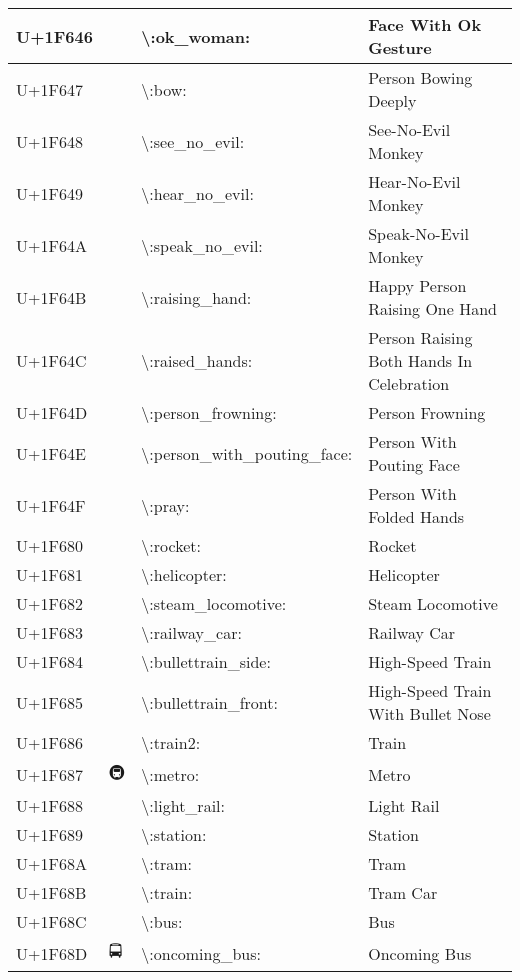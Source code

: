 \begin{table}[h]
\begin{tabulary}{\linewidth}{|L|L|L|L|}
\hline
U+1F646 & 🙆 & {\textbackslash}:ok\_woman: & Face With Ok Gesture \\
\hline
U+1F647 & 🙇 & {\textbackslash}:bow: & Person Bowing Deeply \\
\hline
U+1F648 & 🙈 & {\textbackslash}:see\_no\_evil: & See-No-Evil Monkey \\
\hline
U+1F649 & 🙉 & {\textbackslash}:hear\_no\_evil: & Hear-No-Evil Monkey \\
\hline
U+1F64A & 🙊 & {\textbackslash}:speak\_no\_evil: & Speak-No-Evil Monkey \\
\hline
U+1F64B & 🙋 & {\textbackslash}:raising\_hand: & Happy Person Raising One Hand \\
\hline
U+1F64C & 🙌 & {\textbackslash}:raised\_hands: & Person Raising Both Hands In Celebration \\
\hline
U+1F64D & 🙍 & {\textbackslash}:person\_frowning: & Person Frowning \\
\hline
U+1F64E & 🙎 & {\textbackslash}:person\_with\_pouting\_face: & Person With Pouting Face \\
\hline
U+1F64F & 🙏 & {\textbackslash}:pray: & Person With Folded Hands \\
\hline
U+1F680 & 🚀 & {\textbackslash}:rocket: & Rocket \\
\hline
U+1F681 & 🚁 & {\textbackslash}:helicopter: & Helicopter \\
\hline
U+1F682 & 🚂 & {\textbackslash}:steam\_locomotive: & Steam Locomotive \\
\hline
U+1F683 & 🚃 & {\textbackslash}:railway\_car: & Railway Car \\
\hline
U+1F684 & 🚄 & {\textbackslash}:bullettrain\_side: & High-Speed Train \\
\hline
U+1F685 & 🚅 & {\textbackslash}:bullettrain\_front: & High-Speed Train With Bullet Nose \\
\hline
U+1F686 & 🚆 & {\textbackslash}:train2: & Train \\
\hline
U+1F687 & 🚇 & {\textbackslash}:metro: & Metro \\
\hline
U+1F688 & 🚈 & {\textbackslash}:light\_rail: & Light Rail \\
\hline
U+1F689 & 🚉 & {\textbackslash}:station: & Station \\
\hline
U+1F68A & 🚊 & {\textbackslash}:tram: & Tram \\
\hline
U+1F68B & 🚋 & {\textbackslash}:train: & Tram Car \\
\hline
U+1F68C & 🚌 & {\textbackslash}:bus: & Bus \\
\hline
U+1F68D & 🚍 & {\textbackslash}:oncoming\_bus: & Oncoming Bus \\

\end{tabulary}
\end{table}
